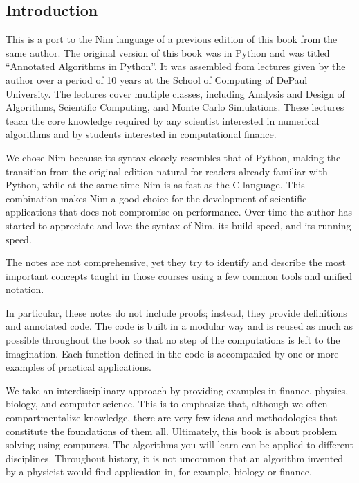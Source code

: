 \documentclass[justified, sixbynine]{tufte-book}
\theoremstyle{plain}%
\newtheorem * {corollary}{Corollary}
\theoremstyle{definition}
\theoremstyle{remark}
\newtheorem * {remark}{Remark}
\newtheorem * {note}{Note}
\begin{document}
\setlength{\cftparskip}{\baselineskip}
\tableofcontents

\mainmatter
\begin{fullwidth}

\goodbreak\chapter{Introduction}

This is a port to the Nim language of a previous edition of this book from the same author. The original version of this book was in Python and was titled ``Annotated Algorithms in Python''. It was assembled from lectures given by the author over a period of 10 years at the School of Computing of DePaul University. The lectures cover multiple classes, including Analysis and Design of Algorithms, Scientific Computing, and Monte Carlo Simulations. These lectures teach the core knowledge required by any scientist interested in numerical algorithms and by students interested in computational finance.

We chose Nim because its syntax closely resembles that of Python, making the transition from the original edition natural for readers already familiar with Python, while at the same time Nim is as fast as the C language. This combination makes Nim a good choice for the development of scientific applications that does not compromise on performance. Over time the author has started to appreciate and love the syntax of Nim, its build speed, and its running speed.

The notes are not comprehensive, yet they try to identify and describe the most important concepts taught in those courses using a few common tools and unified notation.

In particular, these notes do not include proofs; instead, they provide definitions and annotated code. The code is built in a modular way and is reused as much as possible throughout the book so that no step of the computations is left to the imagination. Each function defined in the code is accompanied by one or more examples of practical applications.

We take an interdisciplinary approach by providing examples in finance, physics, biology, and computer science. This is to emphasize that, although we often compartmentalize knowledge, there are very few ideas and methodologies that constitute the foundations of them all. Ultimately, this book is about problem solving using computers. The algorithms you will learn can be applied to different disciplines. Throughout history, it is not uncommon that an algorithm invented by a physicist would find application in, for example, biology or finance.


\end{fullwidth}
\end{document}
